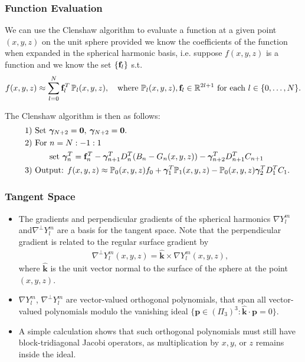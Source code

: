 \documentclass[10pt]{beamer}
\newcommand{\R}{\mathbb{R}}
\newcommand{\bigP}{\mathbb{P}}
\newcommand{\Pl}{\mathbb{P}_l}
\newcommand{\gradYlm}{\nabla Y^m_l}
\newcommand{\gradpYlm}{\nabla^\perp Y^m_l}
\newcommand{\unitvec}{\hat{\bm{k}}}
\begin{document}
\frame
{
    \frametitle{Function Evaluation}
    
We can use the Clenshaw algorithm to evaluate a function at a given point \((x,y,z)\) on the unit sphere provided we know the coefficients of the function when expanded in the spherical harmonic basis, i.e. suppose \(f(x,y,z)\) is a function and we know the set \(\{\bold{f}_l\}\) s.t.
\begin{align}
f(x,y,z) \approx \sum^N_{l=0} \bold{f}_l^T \, \Pl (x,y,z), \quad \text{where } \Pl (x,y,z), \bold{f}_l \in \R^{2l+1} \text{ for each } l \in \{0,\dots,N\}.
\end{align}

The Clenshaw algorithm is then as follows:
\begin{align*}
\quad &\text{1) } \text{Set } \bm{\gamma}_{N+2} = \bold{0}, \: \bm{\gamma}_{N+2} = \bold{0}. \\
\quad &\text{2) } \text{For } n = N:-1:1 \\
\quad & \quad \quad \quad \text{set } \bm{\gamma}_{n}^T = \bold{f}_n^T - \bm{\gamma}_{n+1}^T D^T_n (B_n - G_n(x,y,z)) -  \bm{\gamma}_{n+2}^T D^T_{n+1}C_{n+1} \\
\quad &\text{3) } \text{Output: } f(x,y,z) \approx \bigP_0(x,y,z) f_0 + \bm{\gamma}_{1}^T \bigP_1(x,y,z) - \bigP_0(x,y,z) \bm{\gamma}_{2}^T D^T_1 C_1.
\end{align*}

}

\frame
{
    \frametitle{Tangent Space}

\begin{itemize}

\item The gradients and perpendicular gradients of the spherical harmonics \(\gradYlm\) and\(\gradpYlm\) are a basis for the tangent space. Note that the perpendicular gradient is related to the regular surface gradient by
\begin{align}
\gradpYlm(x,y,z) = \unitvec \times \gradYlm(x,y,z),
\end{align}
where \(\unitvec\) is the unit vector normal to the surface of the sphere at the point \((x,y,z)\).

\item \(\gradYlm\), \(\gradpYlm\) are vector-valued orthogonal polynomials, that span all vector-valued polynomials modulo the vanishing ideal $\{ \bm{p} \in (\Pi_3)^3  : \unitvec \cdot \bm{p} = 0 \}$. 

\item A simple calculation shows that such orthogonal polynomials must still have block-tridiagonal Jacobi operators, as multiplication by $x, y$, or $z$ remains inside the ideal. 

\end{itemize}

}
\end{document}
